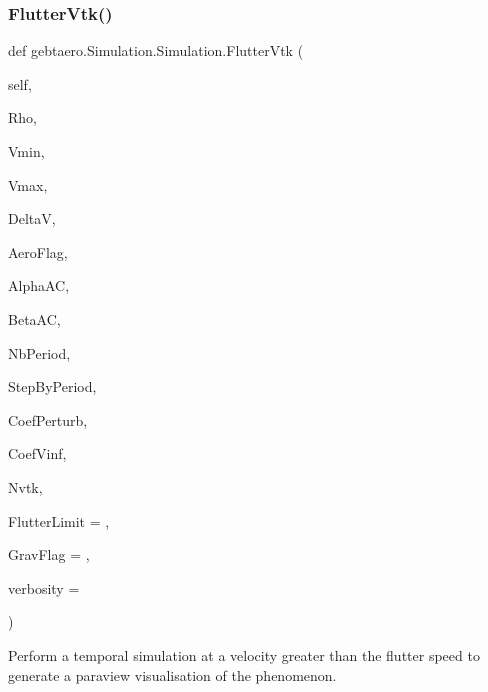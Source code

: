 \subsubsection{\texorpdfstring{Flutter\+Vtk()}{FlutterVtk()}}
{\footnotesize\ttfamily def gebtaero.\+Simulation.\+Simulation.\+Flutter\+Vtk (\begin{DoxyParamCaption}\item[{}]{self,  }\item[{}]{Rho,  }\item[{}]{Vmin,  }\item[{}]{Vmax,  }\item[{}]{DeltaV,  }\item[{}]{Aero\+Flag,  }\item[{}]{Alpha\+AC,  }\item[{}]{Beta\+AC,  }\item[{}]{Nb\+Period,  }\item[{}]{Step\+By\+Period,  }\item[{}]{Coef\+Perturb,  }\item[{}]{Coef\+Vinf,  }\item[{}]{Nvtk,  }\item[{}]{Flutter\+Limit = {},  }\item[{}]{Grav\+Flag = {},  }\item[{}]{verbosity = {} }\end{DoxyParamCaption})}



Perform a temporal simulation at a velocity greater than the flutter speed to generate a paraview visualisation of the phenomenon. 


